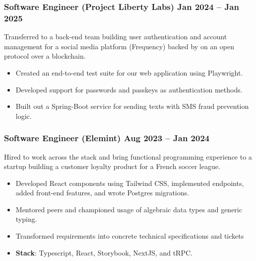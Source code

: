 \documentclass[10pt]{article} %
\providecommand{\tightlist}{%
  \setlength{\itemsep}{0pt}\setlength{\parskip}{0pt}}
\begin{document}
\begin{paracol}{2}
\hypertarget{software-engineer-project-liberty-labs-jan-2024-jan-2025}{%
\subsubsection{\texorpdfstring{\small Software Engineer (Project Liberty
Labs) \hfill \small Jan 2024 -- Jan
2025}{Software Engineer (Project Liberty Labs) Jan 2024 -- Jan 2025}}\label{software-engineer-project-liberty-labs-jan-2024-jan-2025}}

Transferred to a back-end team building user authentication and account
management for a social media platform (Frequency) backed by on an open
protocol over a blockchain.

\begin{itemize}
\tightlist
\item
  Created an end-to-end test suite for our web application using
  Playwright.
\item
  Developed support for passwords and passkeys as authentication
  methods.
\item
  Built out a Spring-Boot service for sending texts with SMS fraud
  prevention logic.
\end{itemize}

\hypertarget{software-engineer-elemint-aug-2023-jan-2024}{%
\subsubsection{\texorpdfstring{\small Software Engineer (Elemint)
\hfill \small Aug 2023 -- Jan
2024}{Software Engineer (Elemint) Aug 2023 -- Jan 2024}}\label{software-engineer-elemint-aug-2023-jan-2024}}

Hired to work across the stack and bring functional programming
experience to a startup building a customer loyalty product for a French
soccer league.

\begin{itemize}
\tightlist
\item
  Developed React components using Tailwind CSS, implemented endpoints,
  added front-end features, and wrote Postgres migrations.
\item
  Mentored peers and championed usage of algebraic data types and
  generic typing.
\item
  Transformed requirements into concrete technical specifications and
  tickets
\item
  \textbf{Stack}: Typescript, React, Storybook, NextJS, and tRPC.
\end{itemize}


\end{paracol}
\end{document}
